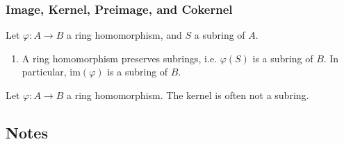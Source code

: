 \subsubsection*{Image, Kernel, Preimage, and Cokernel}

\begin{thmbox}
    \begin{proposition}
        Let \(\varphi: A \rightarrow B\) a ring homomorphism, and \(S\) a subring of \(A\).
        \begin{enumerate}
            \item A ring homomorphism preserves subrings, i.e. \(\varphi(S)\) is a subring of \(B\). In particular, \(\mathrm{im}(\varphi)\) is a subring of \(B\).
        \end{enumerate}
    \end{proposition}
\end{thmbox}

\begin{remark}
    Let \(\varphi: A \rightarrow B\) a ring homomorphism. The kernel is often not a subring.
\end{remark}

\newpage
\subsection*{Notes}

